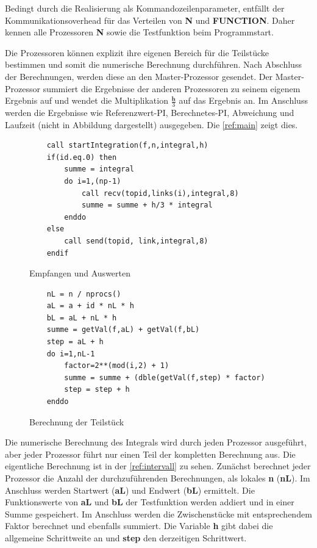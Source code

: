 Bedingt durch die Realisierung als Kommandozeilenparameter, entfällt der Kommunikationsoverhead für das Verteilen von \textbf{N} und \textbf{FUNCTION}.
Daher kennen alle Prozessoren \textbf{N} sowie die Testfunktion beim Programmstart.

Die Prozessoren können explizit ihre eigenen Bereich für die Teilstücke bestimmen und somit die numerische Berechnung durchführen.
Nach Abschluss der Berechnungen, werden diese an den Master-Prozessor gesendet.
Der Master-Prozessor summiert die Ergebnisse der anderen Prozessoren zu seinem eigenem Ergebnis auf und wendet die Multiplikation $\frac{\textbf{h}}{3}$ auf das Ergebnis an.
Im Anschluss werden die Ergebnisse wie Referenzwert-PI, Berechnetes-PI, Abweichung und Laufzeit (nicht in Abbildung dargestellt) ausgegeben. 
Die \autoref{ref:main} zeigt dies.
\begin{figure}[h]
\hrulefill

\begin{minipage}{0.49\textwidth}
\begin{lstlisting}
	call startIntegration(f,n,integral,h)
	if(id.eq.0) then
		summe = integral
		do i=1,(np-1)
			call recv(topid,links(i),integral,8)
			summe = summe + h/3 * integral
		enddo
	else
		call send(topid, link,integral,8)
	endif
\end{lstlisting}
	\caption{Empfangen und Auswerten}
	\label{ref:main}
\end{minipage}
\hfill
\vline
\begin{minipage}{0.49\textwidth}
\begin{lstlisting}
	nL = n / nprocs()
	aL = a + id * nL * h
	bL = aL + nL * h
	summe = getVal(f,aL) + getVal(f,bL)   
	step = aL + h
	do i=1,nL-1
		factor=2**(mod(i,2) + 1)
		summe = summe + (dble(getVal(f,step) * factor)
		step = step + h    
	enddo
\end{lstlisting}
	\caption{Berechnung der Teilstück}
	\label{ref:intervall}
\end{minipage}

\hrulefill
\end{figure}

Die numerische Berechnung des Integrals wird durch jeden Prozessor ausgeführt, aber jeder Prozessor führt nur einen Teil der kompletten Berechnung aus.
Die eigentliche Berechnung ist in der \autoref{ref:intervall} zu sehen.
Zunächst berechnet jeder Prozessor die Anzahl der durchzuführenden Berechnungen, als lokales \textbf{n} (\textbf{nL}).
Im Anschluss werden Startwert (\textbf{aL}) und Endwert (\textbf{bL}) ermittelt.
Die Funktionswerte von \textbf{aL} und \textbf{bL} der Testfunktion werden addiert und in einer Summe gespeichert.
Im Anschluss werden die Zwischenstücke mit entsprechendem Faktor berechnet und ebenfalls summiert.
Die Variable \textbf{h} gibt dabei die allgemeine Schrittweite an und \textbf{step} den derzeitigen Schrittwert.

